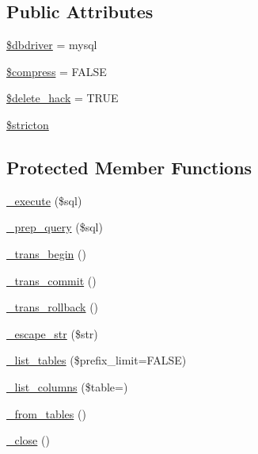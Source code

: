\subsection*{Public Attributes}
\begin{DoxyCompactItemize}
\item 
\mbox{\hyperlink{class_c_i___d_b__mysql__driver_a0cde2a16322a023d040aa7f725877597}{\$dbdriver}} = \textquotesingle{}mysql\textquotesingle{}
\item 
\mbox{\hyperlink{class_c_i___d_b__mysql__driver_abf799de0d30288b91ee73769281dd69d}{\$compress}} = F\+A\+L\+SE
\item 
\mbox{\hyperlink{class_c_i___d_b__mysql__driver_ad60008f32a478e978c7c3284f320f273}{\$delete\+\_\+hack}} = T\+R\+UE
\item 
\mbox{\hyperlink{class_c_i___d_b__mysql__driver_afb42d9811bec1da94506e5764e1439e0}{\$stricton}}
\end{DoxyCompactItemize}
\subsection*{Protected Member Functions}
\begin{DoxyCompactItemize}
\item 
\mbox{\hyperlink{class_c_i___d_b__mysql__driver_a114ab675d89bf8324a41785fb475e86d}{\+\_\+execute}} (\$sql)
\item 
\mbox{\hyperlink{class_c_i___d_b__mysql__driver_a86af88ef0fa6d44ab4691e3f53270339}{\+\_\+prep\+\_\+query}} (\$sql)
\item 
\mbox{\hyperlink{class_c_i___d_b__mysql__driver_ac81ac882c1d54347d810199a15856aac}{\+\_\+trans\+\_\+begin}} ()
\item 
\mbox{\hyperlink{class_c_i___d_b__mysql__driver_a6fe7f373e0b11cfae23a5f41c0b35dda}{\+\_\+trans\+\_\+commit}} ()
\item 
\mbox{\hyperlink{class_c_i___d_b__mysql__driver_ad49a116b0776c26b53114c9093fd102a}{\+\_\+trans\+\_\+rollback}} ()
\item 
\mbox{\hyperlink{class_c_i___d_b__mysql__driver_af8ef0237bfcdb19215b63fff769e7a55}{\+\_\+escape\+\_\+str}} (\$str)
\item 
\mbox{\hyperlink{class_c_i___d_b__mysql__driver_a435c0f3ce54fe7daa178baa8532ebd54}{\+\_\+list\+\_\+tables}} (\$prefix\+\_\+limit=F\+A\+L\+SE)
\item 
\mbox{\hyperlink{class_c_i___d_b__mysql__driver_a7ccb7f9c301fe7f0a9db701254142b63}{\+\_\+list\+\_\+columns}} (\$table=\textquotesingle{}\textquotesingle{})
\item 
\mbox{\hyperlink{class_c_i___d_b__mysql__driver_aef43f7e3e7b71d337ff3724c5eb14f10}{\+\_\+from\+\_\+tables}} ()
\item 
\mbox{\hyperlink{class_c_i___d_b__mysql__driver_a4d9082658000e5ede8312067c6dda9db}{\+\_\+close}} ()
\end{DoxyCompactItemize}

